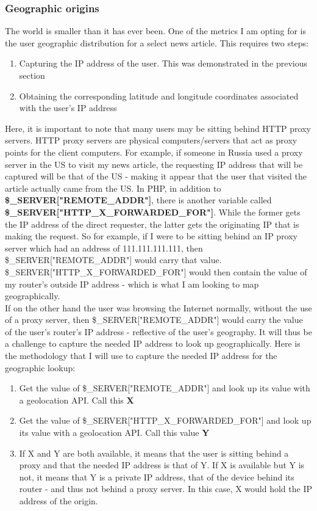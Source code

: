\documentclass[12pt]{article}
\begin{document}
\subsubsection{Geographic origins}
The world is smaller than it has ever been. One of the metrics I am opting for is the user geographic distribution for a select news article. This requires two steps:
\begin{enumerate}
\item Capturing the IP address of the user. This was demonstrated in the previous section
\item Obtaining the corresponding latitude and longitude coordinates associated with the user's IP address
\end{enumerate}

Here, it is important to note that many users may be sitting behind HTTP proxy servers. HTTP proxy servers are physical computers/servers that act as proxy points for the client computers. For example, if someone in Russia used a proxy server in the US to visit my news article, the requesting IP address that will be captured will be that of the US - making it appear that the user that visited the article actually came from the US. In PHP, in addition to \textbf{\$\_SERVER["REMOTE\_ADDR"]}, there is another variable called \textbf{\$\_SERVER["HTTP\_X\_FORWARDED\_FOR"]}. While the former gets the IP address of the direct requester, the latter gets the originating IP that is making the request. So for example, if I were to be sitting behind an IP proxy server which had an address of 111.111.111.111, then \$\_SERVER["REMOTE\_ADDR"] would carry that value. \\
\$\_SERVER["HTTP\_X\_FORWARDED\_FOR"] would then contain the value of my router's outside IP address - which is what I am looking to map geographically.   
\\ If on the other hand the user was browsing the Internet normally, without the use of a proxy server, then \$\_SERVER["REMOTE\_ADDR"] would carry the value of the user's router's IP address - reflective of the user's geography. 
It will thus be a challenge to capture the needed IP address to look up geographically. Here is the methodology that I will use to capture the needed IP address for the geographic lookup:
\begin{enumerate}
\item Get the value of \$\_SERVER["REMOTE\_ADDR"] and look up its value with a geolocation API. Call this \textbf{X}
\item Get the value of \$\_SERVER["HTTP\_X\_FORWARDED\_FOR"] and look up its value with a geolocation API. Call this value \textbf{Y}
\item If X and Y are both available, it means that the user is sitting behind a proxy and that the needed IP address is that of Y. If X is available but Y is not, it means that Y is a private IP address, that of the device behind its router - and thus not behind a proxy server. In this case, X would hold the IP address of the origin.
\end{enumerate} 
\end{document}
